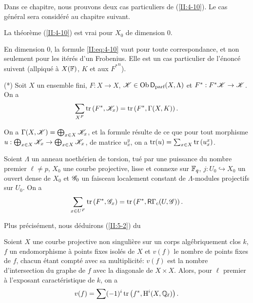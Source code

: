 Dans ce chapitre, nous prouvons deux cas particuliers de (\ref{II:4-10}). Le 
cas g\'en\'eral sera consid\'er\'e au chapitre suivant. 





\begin{lemma_}\label{II:5-1}
La th\'eor\`eme (\ref{II:4-10}) est vrai pour $X_0$ de dimension $0$. 
\end{lemma_}

En dimension $0$, la formule \eqref{II:eq:4-10} vaut pour toute 
correspondance, et non seulement pour les it\'er\'es d'un Frobenius. Elle est 
un cas particulier de l'\'enonc\'e suivent (allpiqu\'e \`a $X(\mathbb{F})$, $K$ et 
aux ${F^*}^n$). 

(*) Soit $X$ un ensemble fini, $F:X\to X$, $\mathscr{K}\in\operatorname{Ob}\mathsf{D}_\text{parf}(X,\Lambda)$ 
et $F^*:F^* \mathscr{K}\to \mathscr{K}$. On a 
\[
  \sum_{X^F} \operatorname{tr}\left(F^*,\mathscr{K}_x\right) = \operatorname{tr}\left(F^*,\Gamma(X,K)\right) \text{.}
\]

On a $\Gamma(X,\mathscr{K})=\bigoplus_{x\in X} \mathscr{K}_x$, et la formule r\'esulte de ce que 
pour tout morphisme $u:\bigoplus_{x\in X} \mathscr{K}_x\to \bigoplus_{x\in X} \mathscr{K}_x$, de 
matrice $u_x^y$, on a $\operatorname{tr}(u)=\sum_{x\in X} \operatorname{tr}\left(u_x^x\right)$. 





\begin{lemma_}\label{II:5-2}
Soient $\Lambda$ un anneau noeth\'erien de torsion, tu\'e par une puissance du 
nombre premier $\ell\ne p$, $X_0$ une courbe projective, lisse et connexe sur 
$\mathbb{F}_q$, $j:U_0\hookrightarrow X_0$ un ouvert dense de $X_0$ et $\mathscr{G}_0$ un 
faisceau localement constant de $\Lambda$-modules projectifs sur $U_0$. On a 
\[
  \sum_{x\in U^F} \operatorname{tr}\left(F^*,\mathscr{G}_x\right) = \operatorname{tr}\left(F^*,\mathsf{R}\Gamma_c(U,\mathscr{G})\right) \text{.}
\]
\end{lemma_}

Plus pr\'ecis\'ement, nous d\'eduirons (\ref{II:5-2}) du 





\begin{theorem_}\label{II:5-3}
Soient $X$ une courbe projective non singuli\`ere sur un corps alg\'ebriquement 
clos $k$, $f$ un endomorphisme \`a points fixes isol\'es de $X$ et $v(f)$ le 
nombre de points fixes de $f$, chacun \'etant compt\'e avec sa multiplicit\'e: 
$v(f)$ est la nombre d'intersection du graphe de $f$ avec la diagonale de 
$X\times X$. Alors, pour $\ell$ premier \`a l'exposant caract\'eristique de $k$, 
on a 
\[
  v(f) = \sum (-1)^i \operatorname{tr}\left(f^*,\operatorname{H}^i(X,\mathbb{Q}_\ell)\right) \text{.}
\]
\end{theorem_}

